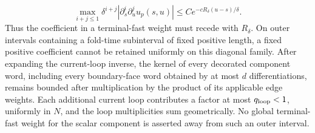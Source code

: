 \begin{lemma}
\begin{equation}
 \max_{i+j\le1}\delta^{i+j}
 |\partial_s^i\partial_u^ju_p(s,u)|
 \le C e^{-cR_\delta(u-s)/\delta}.                \label{eq:diagonal-repelling-terminal-kernel}
\end{equation}
Thus the coefficient in a terminal-fast weight must recede with
\(R_\delta\).  On outer intervals containing a fold-time subinterval of
fixed positive length, a fixed positive coefficient cannot be retained
uniformly on this diagonal family.
After expanding the current-loop inverse, the kernel of every decorated
component word, including every boundary-face word obtained by at most
\(d\) differentiations, remains bounded after multiplication by the product
of its applicable edge weights.  Each additional current loop contributes
a factor at most \(q_{\rm loop}<1\), uniformly in \(N\), and the loop
multiplicities sum geometrically.  No global terminal-fast weight for the
scalar component is asserted away from such an outer interval.


\end{lemma}
